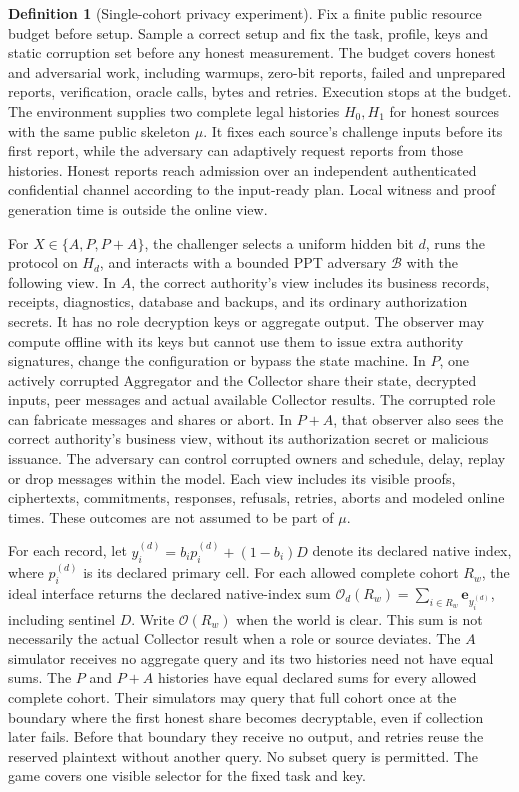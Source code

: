 \documentclass[conference,compsoc]{IEEEtran}
\theoremstyle{definition}
\newtheorem{definition}{Definition}[section]
\newtheorem{definition}{Definition}
\numberwithin{equation}{section}
\numberwithin{table}{section}
\numberwithin{figure}{section}
\theoremstyle{plain}
\begin{document}
\begin{definition}[Single-cohort privacy experiment]
\label{game:privacy}
Fix a finite public resource budget before setup. Sample a correct setup and
fix the task, profile, keys and static corruption set before any honest
measurement. The budget covers honest and
adversarial work, including warmups, zero-bit reports, failed and unprepared
reports, verification, oracle calls, bytes and retries. Execution stops at the
budget. The environment supplies two complete legal histories \(H_0,H_1\) for
honest sources with the same public skeleton \(\mu\). It fixes each source's
challenge inputs before its first report, while the adversary can adaptively
request reports from those histories. Honest reports reach admission over an
independent authenticated confidential channel according to the input-ready
plan. Local witness and proof generation time is outside the online view.

For \(X\in\{A,P,P{+}A\}\), the challenger selects a uniform hidden bit \(d\), runs
the protocol on \(H_d\), and interacts with a bounded PPT adversary
\(\mathcal B\) with the following view. In \(A\),
the correct authority's view includes its business records, receipts,
diagnostics, database and backups, and its ordinary authorization secrets.
It has no role decryption keys or aggregate output. The observer may compute
offline with its keys but cannot use them to issue extra authority signatures,
change the configuration or bypass the state machine. In \(P\), one actively corrupted
Aggregator and the Collector share their state, decrypted inputs, peer
messages and actual available Collector results. The corrupted role can
fabricate messages and shares or abort. In \(P{+}A\), that observer also sees
the correct authority's business view, without its authorization secret or
malicious issuance. The adversary can control corrupted owners and schedule,
delay, replay or drop messages within the model. Each view includes its
visible proofs, ciphertexts, commitments, responses, refusals, retries, aborts
and modeled online times. These outcomes are not assumed to be part of \(\mu\).

For each record, let \(y_i^{(d)}=b_i p_i^{(d)}+(1-b_i)D\) denote its
declared native index, where \(p_i^{(d)}\) is its declared primary cell. For
each allowed complete cohort \(R_w\), the ideal interface returns the
declared native-index sum \(\mathcal O_d(R_w)=\sum_{i\in R_w}
\mathbf e_{y_i^{(d)}}\), including sentinel \(D\). Write \(\mathcal O(R_w)\)
when the world is clear. This sum is not necessarily
the actual Collector result when a role or source deviates. The \(A\)
simulator receives no aggregate query and its two histories need not have
equal sums. The \(P\) and \(P{+}A\) histories have equal declared sums for
every allowed complete cohort. Their simulators may query that full cohort
once at the boundary where the first honest share becomes decryptable, even if
collection later fails. Before that boundary they receive no output, and
retries reuse the reserved plaintext without another query. No subset query is
permitted. The game covers one visible selector for the fixed task and key.


\end{definition}
\end{document}
